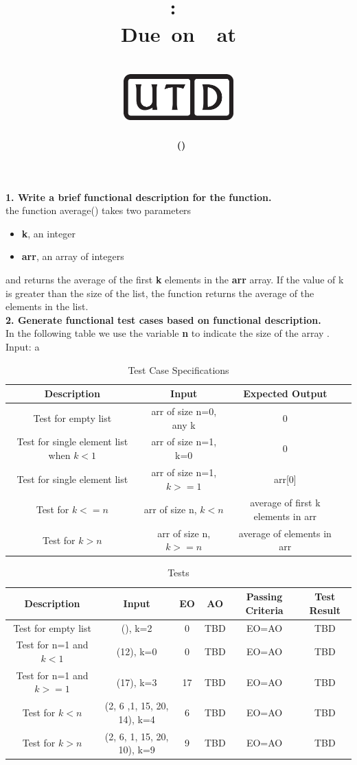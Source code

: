 \documentclass[12pt,letterpaper,titlepage,en-US]{article}
\title{
    \vspace{1in}
    \textmd{\textbf{\hmwkClassName \\\hmwkClass:\ \hmwkTitle }}\\
    \normalsize\vspace{0.1in}\small{Due\ on\ \DTMusedate{DueDate}\ at \DTMusetime{DueDate} }\\
    \vspace{0.1in}\large{\textit{\hmwkClassInstructor}}\\
    \vspace{0.5in}\includegraphics[height=2.4em]{UTD_logo_BW}\\
    \vspace{2in}
}
\author{\textbf{\hmwkAuthorName\ \footnotesize{(\hmwkAuthorNetID)}} \\ }
\date{}
\begin{document}
\maketitle




\textbf{1. Write a brief functional description for the function.}\\
the function average() takes two parameters
\begin{itemize}[nolistsep,noitemsep]
\item \textbf{k}, an integer
\item \textbf{arr}, an array of integers
\end{itemize} 
and returns the average of the first \textbf{k} elements in the \textbf{arr} array. If the value of k is greater than the size of the list, the function returns the average of the elements in the list.\\




\textbf{2. Generate functional test cases based on functional description.}\\
In the following table we use the  variable \textbf{n} to indicate the size of the array \textbf{}.
Input: a
\begin{table}[H]
\centering
\begin{tabular}{|c|c|c|c|}
\hline
Description &Input   &Expected Output       \\\hline
Test for empty list & 	 arr of size n=0, any k 	& 0	 \\\hline
Test for single element list when $ k<1$ & arr of size n=1, k=0 & 0 \\\hline
Test for single element list &	arr of size n=1, $k>=1$	& arr[0]\\\hline
Test for $k<=n$ &  arr of size n,  $k<n$ & average of first k elements in arr \\\hline
Test for $k>n$ & arr of size n,  $k>=n$	& average of elements in arr \\\hline


\end{tabular}
\caption{Test Case Specifications}\label{1}
\end{table}


\begin{table}[H]
\centering
\begin{tabular}{|c|c|c|c|c|c|}
\hline
Description &Input   &EO & AO & Passing Criteria & Test Result    \\\hline
Test for empty list & 	 (), k=2 	& 0 & TBD & EO=AO & TBD	 \\\hline
Test for n=1 and $ k<1$ & (12), k=0 & 0 & TBD & EO=AO   & TBD \\\hline
Test for n=1 and $k>=1$ &	 (17), k=3	& 17 & TBD & EO=AO & TBD\\\hline
Test for $k<n$ &  (2, 6 ,1, 15, 20, 14), k=4  &  6 & TBD & EO=AO & TBD \\\hline
Test for $k>n$ & (2, 6, 1, 15, 20, 10), k=9 &  9 & TBD & EO=AO & TBD	  \\\hline


\end{tabular}
\caption{Tests}\label{1}
\end{table}
\end{document}
